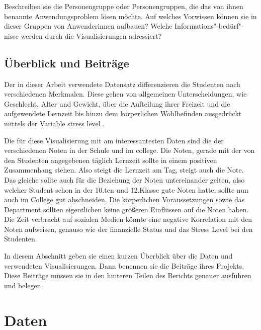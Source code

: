 \documentclass[usegeometry=true]{scrartcl}
\begin{document}
Beschreiben sie die Personengruppe oder Personengruppen, die das von ihnen benannte Anwendungsproblem lösen möchte. Auf welches Vorwissen können sie in dieser Gruppen von Anwenderinnen aufbauen? Welche Informations"-bedürf"-nisse werden durch die Visualisierungen adressiert?
\subsection{Überblick und Beiträge}
Der in dieser Arbeit verwendete Datensatz differenzieren die Studenten nach verschiedenen Merkmalen. Diese gehen von allgemeinen Unterscheidungen, wie Geschlecht, Alter und Gewicht, über die Aufteilung ihrer Freizeit und die aufgewendete Lernzeit bis hinzu dem körperlichen Wohlbefinden ausgedrückt mittels der Variable \glq stress level \grq .



\noindent Die für diese Visualisierung mit am interessantesten Daten sind die der verschiedenen Noten in der Schule und im college. Die Noten, gerade mit der von den Studenten angegebenen täglich Lernzeit sollte in einem positiven Zusammenhang stehen. Also steigt die Lernzeit am Tag, steigt auch die Note. Das gleiche sollte auch für die Beziehung der Noten untereinander gelten, also welcher Student schon in der 10.ten und 12.Klasse gute Noten hatte, sollte nun auch im College gut abschneiden. 
\noindent Die körperlichen Voraussetzungen sowie das Department sollten eigentlichen keine größeren Einflüssen auf die Noten haben.
\noindent Die Zeit verbracht auf sozialen Medien könnte eine negative Korrelation mit den Noten aufweisen, genauso wie der finanzielle Status und das Stress Level bei den Studenten.

In diesem Abschnitt geben sie einen kurzen Überblick über die Daten und verwendeten Visualisierungen. Dann benennen sie die Beiträge ihres Projekts. Diese Beiträge müssen sie in den hinteren Teilen des Berichts genauer ausführen und belegen.

\section{Daten}
\end{document}
